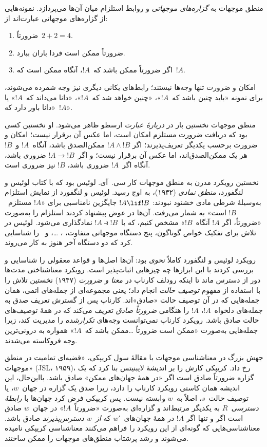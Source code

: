 \documentclass[../../../include/open-logic-section]{subfiles}
\begin{document}


منطق موجهات به \emph{گزاره‌های موجهاتی} و روابط استلزام میان آن‌ها
می‌پردازد. نمونه‌هایی از گزاره‌های موجهاتی عبارت‌اند از:
\begin{enumerate}
\item ضرورتاً~$2+2=4$.
\item ضرورتاً ممکن است فردا باران ببارد.
\item اگر ضرورتاً ممکن باشد که~$!A$، آنگاه ممکن است که~$!A$.
\end{enumerate}
امکان و ضرورت تنها وجه‌ها نیستند؛ رابط‌های یکانی دیگری نیز وجه شمرده
می‌شوند، برای نمونه «باید چنین باشد که~$!A$»، «چنین خواهد شد که~$!A$»،
«دانا می‌داند که~$!A$» یا «دانا باور دارد که~$!A$».

منطق موجهات نخستین بار در \emph{دربارهٔ عبارت} ارسطو ظاهر می‌شود. او
نخستین کسی بود که دریافت ضرورت مستلزم امکان است، اما عکس آن برقرار
نیست؛ امکان و ضرورت برحسب یکدیگر تعریف‌پذیرند؛ اگر
$!A \land !B$ ممکن‌الصدق باشد، آنگاه~$!A$ و~$!B$ هر یک ممکن‌الصدق‌اند،
اما عکس آن برقرار نیست؛ و اگر~$!A \to !B$ ضروری باشد، آنگاه اگر~$!A$
ضروری باشد، $!B$ نیز ضروری است.

نخستین رویکرد مدرن به منطق موجهات کار سی.~آی. لوئیس بود که با کتاب
لوئیس و لنگفورد، \emph{منطق نمادی} (۱۹۳۲)، به اوج رسید. لوئیس و
لنگفورد از نمایش استلزام به‌وسیلهٔ شرطی مادی خشنود نبودند:
$!A \lif !B$ جایگزین نامناسبی برای «$!A$ مستلزم~$!B$ است» به شمار
می‌رفت. آن‌ها در عوض پیشنهاد کردند استلزام را به‌صورت «ضرورتاً، اگر
$!A$ آنگاه~$!B$» مشخص کنیم، که با~$!A \strictif !B$ نمادگذاری می‌شود.
لوئیس در تلاش برای تفکیک خواص گوناگون، پنج دستگاه موجهاتی متفاوت،
، \ldots،  و~ را شناسایی کرد که دو دستگاه آخر
هنوز به کار می‌روند.

رویکرد لوئیس و لنگفورد کاملاً \emph{نحوی} بود: آن‌ها اصل‌ها و قواعد
معقولی را شناسایی و بررسی کردند با این ابزارها چه چیزهایی اثبات‌پذیر
است. رویکرد معناشناختی مدت‌ها دور از دسترس ماند تا اینکه رودلف کارناپ
در \emph{معنا و ضرورت} (۱۹۴۷) نخستین تلاش را با استفاده از مفهوم
\emph{توصیف حالت} انجام داد؛ یعنی مجموعه‌ای از جمله‌های اتمی، همان
جمله‌هایی که در آن توصیف حالت «صادق»اند. کارناپ پس از گسترش تعریف صدق
به جمله‌های دلخواه~$!A$، $!A$ را هنگامی \emph{ضرورتاً صادق} تعریف می‌کند
که در همهٔ توصیف‌های حالت صادق باشد. رویکرد کارناپ نمی‌توانست وجه‌های
\emph{تکرارشده} را مدیریت کند، زیرا جمله‌هایی به‌صورت «ممکن است ضرورتاً
\ldots ممکن باشد که~$!A$» همواره به درونی‌ترین وجه فروکاسته می‌شدند.

جهش بزرگ در معناشناسی موجهات با مقالهٔ سول کریپکی، «قضیه‌ای تمامیت در
منطق موجهات» (JSL، ۱۹۵۹)، رخ داد. کریپکی کارش را بر اندیشهٔ لایبنیتس
بنا کرد که یک گزاره ضرورتاً صادق است اگر «در همهٔ جهان‌های ممکن» صادق
باشد. بااین‌حال، این اندیشه همان کاستی رویکرد کارناپ را دارد، زیرا صدق
یک گزاره در جهان~$w$، یا توصیف حالت~$s$، اصلاً به~$w$ وابسته نیست. پس
کریپکی فرض کرد جهان‌ها با \emph{رابطهٔ دسترسی}~$R$ به یکدیگر مرتبط‌اند
و گزاره‌ای به‌صورت «ضرورتاً~$!A$» در جهان~$w$ صادق است اگر و تنها اگر
$!A$ در همهٔ جهان‌های~$w'$ که \emph{از~$w$ دسترس‌پذیرند} صادق باشد.
معناشناسی‌هایی که گونه‌ای از این رویکرد را فراهم می‌کنند معناشناسی
کریپکی نامیده می‌شوند و رشد پرشتاب منطق‌های موجهات را ممکن ساختند.
\end{document}
